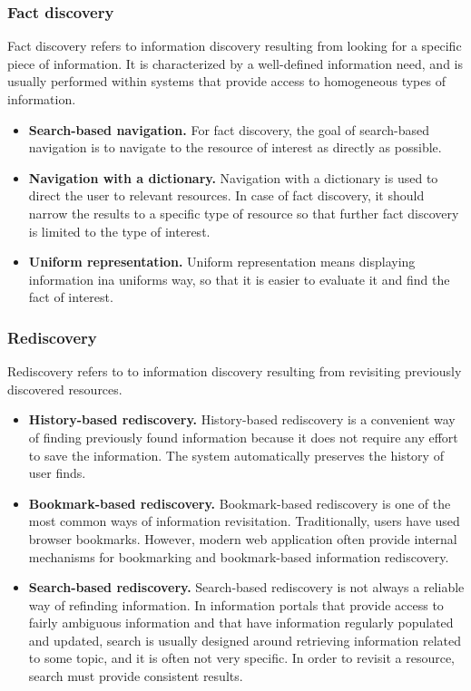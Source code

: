 \documentclass{casconpaper}
\begin{document}
{\subsubsection{Fact discovery}
Fact discovery refers to information discovery resulting from looking for a specific piece of information. It is characterized by a well-defined information need, and is usually performed within systems that provide access to homogeneous types of information.
\begin{itemize}
  \item \textbf{Search-based navigation.} For fact discovery, the goal of search-based navigation is to navigate to the resource of interest as directly as possible. 
  \item \textbf{Navigation with a dictionary.} Navigation with a dictionary is used to direct the user to relevant resources. In case of fact discovery, it should narrow the results to a specific type of resource so that further fact discovery is limited to the type of interest. 
  \item \textbf{Uniform representation.} Uniform representation means displaying information ina uniforms way, so that it is easier to evaluate it and find the fact of interest.
\end{itemize}

} %

{\subsubsection{Rediscovery}
Rediscovery refers to to information discovery resulting from revisiting previously discovered resources. 
\begin{itemize}
  \item \textbf{History-based rediscovery.} History-based rediscovery is a convenient way of finding previously found information because it does not require any effort to save the information. The system automatically preserves the history of user finds. 
  \item \textbf{Bookmark-based rediscovery.} Bookmark-based rediscovery is one of the most common ways of information revisitation. Traditionally, users have used browser bookmarks. However, modern web application often provide internal mechanisms for bookmarking and bookmark-based information rediscovery.
  \item \textbf{Search-based rediscovery.} Search-based rediscovery is not always a reliable way of refinding information. In information portals that provide access to fairly ambiguous information and that have information regularly populated and updated,   search is usually designed around retrieving information related to some topic, and it is often not very specific. In order to revisit a resource, search must provide consistent results.
\end{itemize}
} %
\end{document}
